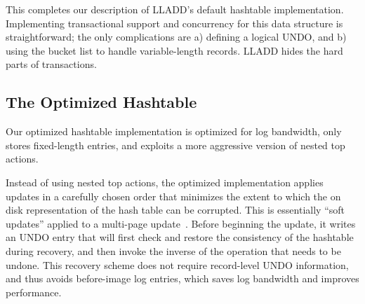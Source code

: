\documentclass[10pt,letterpaper,twocolumn,english]{article}
\newcommand{\yad}{LLADD\xspace}
\newcommand{\eab}[1]{\textcolor{red}{\bf EAB: #1}}
\begin{document}

This completes our description of \yad's default hashtable
implementation.  Implementing
transactional support and concurrency for this data structure is
straightforward; the only complications are a) defining a logical
UNDO, and b) using the bucket list to handle variable-length records. \yad hides the hard parts of transactions.




\subsection{The Optimized Hashtable}
\label{optimizedHT}
Our optimized hashtable implementation is optimized for log bandwidth,
only stores fixed-length entries, and exploits a more aggressive
version of nested top actions.

Instead of using nested top actions, the optimized implementation
applies updates in a carefully chosen order that minimizes the extent
to which the on disk representation of the hash table can be corrupted. 
This is essentially ``soft updates''
applied to a multi-page update~\cite{soft-updates}.  Before beginning
the update, it writes an UNDO entry that will first check and restore the
consistency of the hashtable during recovery, and then invoke the
inverse of the operation that needs to be undone.  This recovery
scheme does not require record-level UNDO information, and thus avoids
before-image log entries, which saves log bandwidth and improves
performance.
\end{document}
